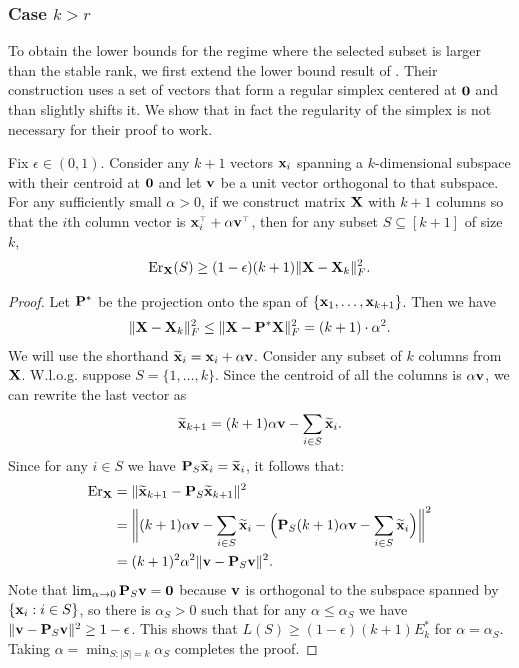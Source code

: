 \documentclass{article}
\begin{document}
\subsubsection{Case $k >r$}
To obtain the lower bounds for the regime where the selected subset is larger than the stable rank, we first extend the lower bound result of
\cite{pca-volume-sampling}. Their construction uses a set of vectors that
form a regular simplex centered at $\zero$ and than slightly
shifts it. We show that in fact the regularity of the simplex is not
necessary for their proof to work.
\begin{lemma}\label{l:simplex}
	Fix $\epsilon\in(0,1)$.  Consider any $k+1$ vectors $\x_i$ spanning a
	$k$-dimensional subspace with their centroid at $\zero$ and let $\v$
	be a unit vector orthogonal to that subspace. For any sufficiently small
	$\alpha>0$, if we construct
	matrix $\X$ with $k+1$ columns so that the $i$th column vector is $\x_i^\top+\alpha\v^\top$, 
	then for any subset $S\subseteq[k+1]$ of size $k$,
	\begin{align*}
	\Er_{\X}(S)\geq (1-\epsilon)(k+1) \| \X -\X_k\|^2_F.
	\end{align*}
\end{lemma}
\begin{proof}
	Let $\P^*$ be the projection onto the span of
	$\{\x_1,\dots,\x_{k+1}\}$. Then we have
	\begin{align*}
	 \| \X -\X_k\|^2_F \leq \|\X - \P^*\X\|_F^2 = (k+1)\cdot\alpha^2.
	\end{align*}
	We will use the shorthand $\xbt_i=\x_i+\alpha\v$. Consider any subset
	of $k$ columns from $\X$. W.l.o.g. suppose 
	$S=\{1,\dots,k\}$. Since the centroid of all the columns is $\alpha\v$,
	we can rewrite the last vector as 
	\begin{align*}
	\xbt_{k+1} = (k+1)\alpha\v - \sum_{i\in S}\xbt_i.
	\end{align*}
	Since for any $i\in S$ we have $\P_S\xbt_i=\xbt_i$, it follows that:
	\begin{align*}
	\Er_{\X} &= \|\xbt_{k+1} - \P_S\xbt_{k+1}\|^2 \\
	&=\bigg\| (k+1)\alpha\v - \sum_{i\in S}\xbt_i - \Big(\P_S (k+1)\alpha\v -
	\sum_{i\in S}\xbt_i\Big)\bigg\|^2\\
	&=(k+1)^2\alpha^2\|\v-\P_S\v\|^2.
	\end{align*}
	Note that $\lim_{\alpha\rightarrow 0}\P_S\v = \zero$ because $\v$
	is orthogonal to the subspace spanned by $\{\x_i:i\in S\}$, so there is
	$\alpha_S>0$ such that for any $\alpha\leq\alpha_S$ we have $\|\v-\P_S\v\|^2\geq 1-\epsilon$. This shows that
	$L(S)\geq (1-\epsilon)(k+1)E_k^*$ for $\alpha=\alpha_S$. Taking
	$\alpha = \min_{S:|S|=k}\alpha_S$ completes the proof.
\end{proof}
\end{document}
